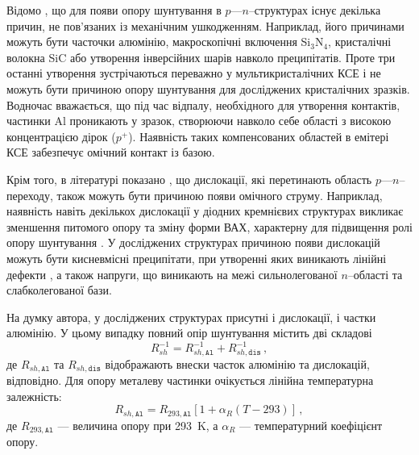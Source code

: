 Відомо \cite{Rsh:Breitenstein,RshMet,Breitenstein2013}, що для появи  опору шунтування в $p$---$n$--структурах існує декілька причин, не
пов'язаних із механічним ушкодженням.
Наприклад, його причинами  можуть бути часточки алюмінію, макроскопічні включення Si$_3$N$_4$, кристалічні волокна SiC або утворення інверсійних шарів
навколо преципітатів.
Проте три  останні утворення зустрічаються переважно у мультикристалічних КСЕ \cite{Rsh:Breitenstein,Breitenstein2013} і не можуть
бути причиною  опору шунтування для досліджених кристалічних зразків.
Водночас вважається, що під час відпалу, необхідного для утворення контактів, частинки Al проникають у зразок,
створюючи навколо себе області з високою концентрацією дірок ($p^+$).
Наявність таких компенсованих областей в емітері КСЕ  забезпечує омічний контакт із базою.

Крім того, в літературі показано \cite{Rsh:Breitenstein,TAT:Gopal,Rsh:Baker,Si:dislIV},
що дислокації, які перетинають область $p$---$n$--переходу, також можуть бути причиною появи омічного струму.
Наприклад, наявність навіть декількох дислокації у діодних кремнієвих структурах викликає зменшення питомого опору
та зміну форми ВАХ, характерну для підвищення ролі  опору  шунтування \cite{Si:dislIV}.
У досліджених структурах причиною появи дислокацій можуть бути кисневмісні преципітати, при утворенні яких
виникають лінійні дефекти \cite{SiO:Hwang,SiO:Vanhell}, а також напруги, що виникають
на межі сильнолегованої $n$--області та слабколегованої бази.

На думку автора, у досліджених структурах присутні і дислокації, і частки алюмінію.
У цьому випадку повний  опір шунтування містить дві складові
\begin{equation}
\label{eqRshFull}
R_{sh}^{-1}=R_{sh,\mathtt{Al}}^{-1}+R_{sh,\mathtt{dis}}^{-1}\,,
\end{equation}
де
$R_{sh,\mathtt{Al}}$ та $R_{sh,\mathtt{dis}}$ відображають внески часток алюмінію та дислокацій, відповідно.
Для опору металеву частинки очікується лінійна температурна залежність:
\begin{equation}
\label{eqRshAl}
R_{sh,\mathtt{Al}}=R_{293,\mathtt{Al}}[1+\alpha_R(T-293)]\,,
\end{equation}
де
$R_{293,\mathtt{Al}}$ --- величина  опору при 293~K,
а
$\alpha_R$ --- температурний коефіцієнт опору.

